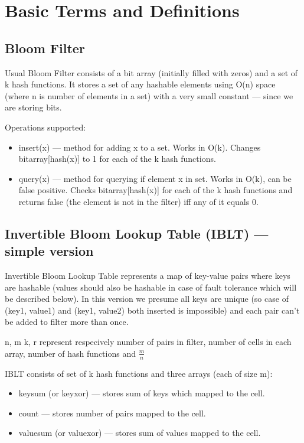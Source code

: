 \documentclass{article}
\begin{document}
\section{Basic Terms and Definitions}

\subsection{Bloom Filter}
Usual Bloom Filter consists of a bit array (initially filled with zeros) and a set of k hash functions.
It stores a set of any hashable elements using O(n) space (where n is number of
elements in a set) with a very small constant --- since we are storing bits.

Operations supported:
\begin{itemize}
    \item insert(x) --- method for adding x to a set. Works in O(k). Changes bitarray[hash(x)] to 1 for each of the k hash functions.
    \item query(x) --- method for querying if element x in set. Works in O(k), can be false positive. Checks bitarray[hash(x)] for each of the k hash functions and returns false (the element is not in the filter) iff any of it equals 0.
\end{itemize}

\subsection{Invertible Bloom Lookup Table (IBLT) --- simple version}
Invertible Bloom Lookup Table represents a map of key-value pairs where keys are
hashable (values should also be hashable in case of fault tolerance which will 
be described below). In this version we presume all keys are unique (so case of 
(key1, value1) and (key1, value2) both inserted is impossible) and each pair 
can't be added to filter more than once.

n, m k, r represent respecively number of pairs in filter, number of cells in
each array, number of hash functions and $\frac{m}{n}$

IBLT consists of set of k hash functions and three arrays (each of size m):
\begin{itemize}
    \item keysum (or keyxor) --- stores sum of keys which mapped to the cell.
    \item count --- stores number of pairs mapped to the cell.
    \item valuesum (or valuexor) --- stores sum of values mapped to the cell.
\end{itemize}
\end{document}
